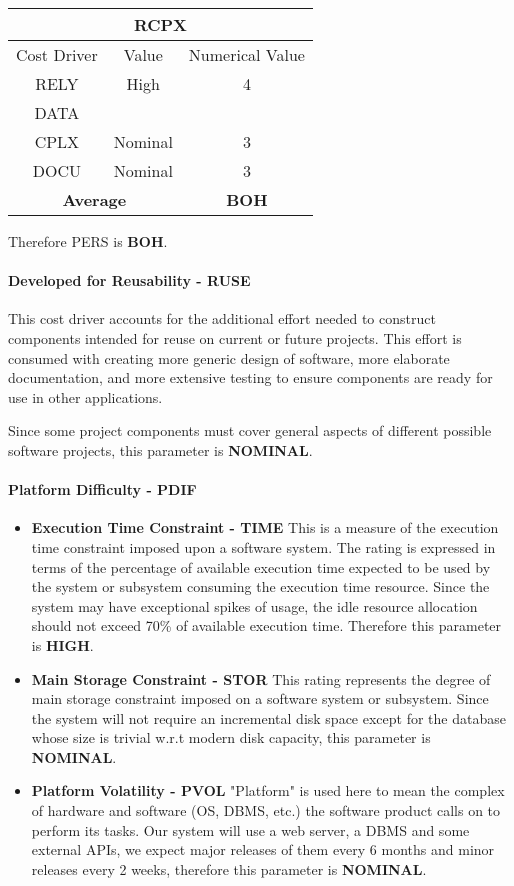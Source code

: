 \begin{longtable}{ccc}
\multicolumn{3}{c}{\textbf{RCPX}}\\
\toprule
Cost Driver&Value&Numerical Value\\
\midrule
RELY&High&4\\
DATA&&\\
CPLX&Nominal&3\\
DOCU&Nominal&3\\
\midrule
\multicolumn{2}{c}{\textbf{Average}}&\textbf{BOH}\\
\bottomrule
\end{longtable}

Therefore PERS is \textbf{BOH}.

\paragraph{Developed for Reusability - RUSE} This cost driver accounts for the additional effort needed to construct components intended for reuse on current or future projects. This effort is consumed with creating more generic design of software, more elaborate documentation, and more extensive testing to ensure components are ready for use in other applications.

Since some project components must cover general aspects of different possible software projects, this parameter is \textbf{NOMINAL}.

\paragraph{Platform Difficulty - PDIF}
\begin{itemize}
	\item \textbf{Execution Time Constraint - TIME} This is a measure of the execution time constraint imposed upon a software system. The rating is expressed in terms of the percentage of available execution time expected to be used by the system or subsystem consuming the execution time resource. Since the system may have exceptional spikes of usage, the idle resource allocation should not exceed 70\% of available execution time. Therefore this parameter is \textbf{HIGH}.
	\item \textbf{Main Storage Constraint - STOR} This rating represents the degree of main storage constraint imposed on a software system or subsystem. Since the system will not require an incremental disk space except for the database whose size is trivial w.r.t modern disk capacity, this parameter is \textbf{NOMINAL}.
	\item \textbf{Platform Volatility - PVOL} "Platform" is used here to mean the complex of hardware and software (OS, DBMS, etc.) the software product calls on to perform its tasks. Our system will use a web server, a DBMS and some external APIs, we expect major releases of them every 6 months and minor releases every 2 weeks, therefore this parameter is \textbf{NOMINAL}.
\end{itemize}

